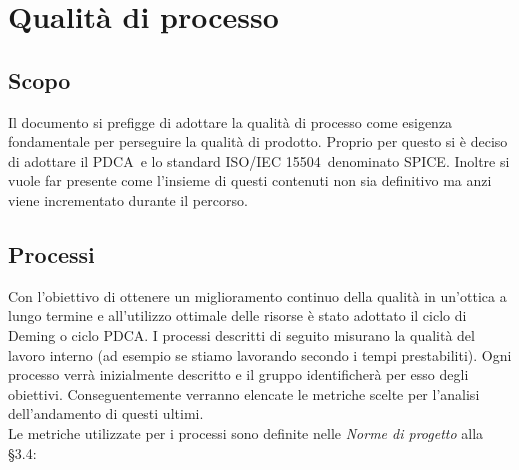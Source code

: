\section{Qualità di processo}
\subsection{Scopo}
Il documento si prefigge di adottare la qualità di processo come esigenza fondamentale per perseguire la qualità di prodotto. Proprio per questo si è deciso di adottare il PDCA\pedice~e lo standard ISO/IEC 15504\pedice~denominato SPICE. Inoltre si vuole far presente come l'insieme di questi contenuti non sia definitivo ma anzi viene incrementato durante il percorso.
\subsection{Processi}
Con l'obiettivo di ottenere un miglioramento continuo della qualità in un'ottica a lungo termine e all'utilizzo ottimale delle risorse è stato adottato il ciclo di Deming o ciclo PDCA.\newline
I processi descritti di seguito misurano la qualità del lavoro interno (ad esempio se stiamo lavorando secondo i tempi prestabiliti).
Ogni processo verrà inizialmente descritto e il gruppo identificherà per esso degli obiettivi. Conseguentemente verranno elencate le metriche scelte per l'analisi dell'andamento di questi ultimi. \\
Le metriche utilizzate per i processi sono definite nelle \textit{Norme di progetto} alla §3.4:

